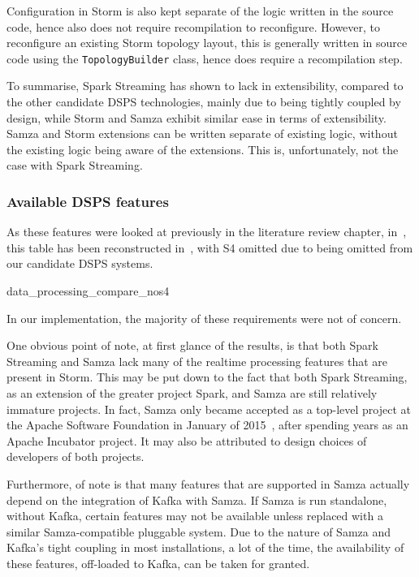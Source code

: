 Configuration in Storm is also kept separate of the logic written in the source code, hence also does not require recompilation
to reconfigure. However, to reconfigure an existing Storm topology layout, this is generally written in source code using
the \texttt{TopologyBuilder} class, hence does require a recompilation step.

To summarise, Spark Streaming has shown to lack in extensibility, compared to the other candidate DSPS technologies, mainly
due to being tightly coupled by design, while Storm and Samza exhibit similar ease in terms of extensibility. Samza and
Storm extensions can be written separate of existing logic, without the existing logic being aware of the extensions.
This is, unfortunately, not the case with Spark Streaming.


\subsubsection{Available DSPS features}

As these features were looked at previously in the literature review chapter, in~,
this table has been reconstructed in~, with S4 omitted due to being omitted from our candidate
DSPS systems.

{data_processing_compare_nos4}

In our implementation, the majority of these requirements were not of concern.

One obvious point of note, at first glance of the results, is that both Spark Streaming and Samza lack many of the realtime processing
features that are present in Storm. This may be put down to the fact that both Spark Streaming, as an extension
of the greater project Spark, and Samza are still relatively immature projects. In fact, Samza only became accepted as a
top-level project at the Apache Software Foundation in January of 2015~\cite{web:apache-top-samza}, after spending years
as an Apache Incubator project. It may also be attributed to design choices of developers of both projects.

Furthermore, of note is that many features that are supported in Samza actually depend on the integration of Kafka with
Samza. If Samza is run standalone, without Kafka, certain features may not be available unless replaced with a similar
Samza-compatible pluggable system. Due to the nature of Samza and Kafka's tight coupling in most installations, a lot
of the time, the availability of these features, off-loaded to Kafka, can be taken for granted.

